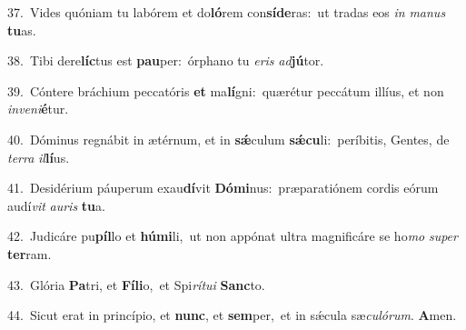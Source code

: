 {\numbfont\textcolor{\numbcolor}{37.}}~Vides quóniam tu labórem et do\-\textbf{ló}\-rem con\-\textbf{sí}\-\textbf{de}ras:~\star ut tradas eos \textit{in} \textit{ma}\-\textit{nus} \textbf{tu}\-as.\par
{\numbfont\textcolor{\numbcolor}{38.}}~Tibi dere\-\textbf{líc}\-tus est \textbf{pau}\-per:~\star órphano tu \textit{e}\-\textit{ris} \textit{ad}\-\textbf{jú}tor.\par
{\numbfont\textcolor{\numbcolor}{39.}}~Cóntere bráchium peccatóris \textbf{et} ma\-\textbf{lí}\-gni:~\star quærétur peccátum illíus, et non \textit{in}\-\textit{ve}\textit{ni}\textbf{é}tur.\par
{\numbfont\textcolor{\numbcolor}{40.}}~Dóminus regnábit in ætérnum, et in \textbf{sǽ}\-culum \textbf{sǽ}\-\textbf{cu}li:~\star períbitis, Gentes, de \textit{ter}\-\textit{ra} \textit{il}\-\textbf{lí}us.\par
{\numbfont\textcolor{\numbcolor}{41.}}~Desidérium páuperum exau\-\textbf{dí}\-vit \textbf{Dó}\-\textbf{mi}nus:~\star præparatiónem cordis eórum audí\textit{vit} \textit{au}\-\textit{ris} \textbf{tu}\-a.\par
{\numbfont\textcolor{\numbcolor}{42.}}~Judicáre pu\-\textbf{píl}\-lo et \textbf{hú}\-\textbf{mi}li,~\star ut non appónat ultra magnificáre se ho\textit{mo} \textit{su}\-\textit{per} \textbf{ter}\-ram.\par
{\numbfont\textcolor{\numbcolor}{43.}}~Glória \textbf{Pa}\-tri, et \textbf{Fí}\-\textbf{li}o,~\star et Spi\-\textit{rí}\-\textit{tu}\textit{i} \textbf{Sanc}\-to.\par
{\numbfont\textcolor{\numbcolor}{44.}}~Sicut erat in princípio, et \textbf{nunc}\-, et \textbf{sem}\-per,~\star et in sǽcula sæ\-\textit{cu}\-\textit{ló}\textit{rum}. \textbf{A}\-men.\par
